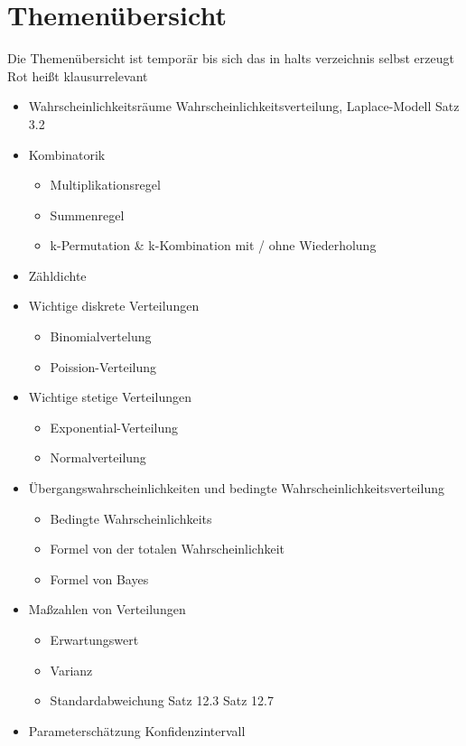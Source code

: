 \section{Themenübersicht}
Die Themenübersicht ist temporär bis sich das in halts verzeichnis selbst erzeugt
Rot heißt klausurrelevant
\begin{itemize}
    \item Wahrscheinlichkeitsräume Wahrscheinlichkeitsverteilung, Laplace-Modell Satz 3.2
    \item Kombinatorik
    \begin{itemize}
        \item Multiplikationsregel
        \item Summenregel
        \item k-Permutation \& k-Kombination mit / ohne Wiederholung
    \end{itemize}
    \item Zähldichte
    \item Wichtige diskrete Verteilungen
    \begin{itemize}
        \item Binomialvertelung
        \item Poission-Verteilung
    \end{itemize}
    \item Wichtige stetige Verteilungen
    \begin{itemize}
        \item Exponential-Verteilung
        \item Normalverteilung
    \end{itemize}
    \item Übergangswahrscheinlichkeiten und bedingte Wahrscheinlichkeitsverteilung
    \begin{itemize}
        \item Bedingte Wahrscheinlichkeits
        \item Formel von der totalen Wahrscheinlichkeit
        \item Formel von Bayes
    \end{itemize}
    \item Maßzahlen von Verteilungen
    \begin{itemize}
        \item Erwartungswert
        \item Varianz
        \item Standardabweichung Satz 12.3 Satz 12.7
    \end{itemize}
    \item Parameterschätzung Konfidenzintervall
\end{itemize}


